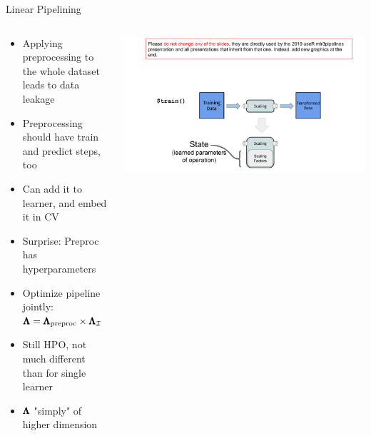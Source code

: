 \begin{frame}{Linear Pipelining}




  \begin{columns}
    \begin{column}{0.5\textwidth}
    \begin{itemize}
      \item Applying preprocessing to the whole dataset leads to data leakage
      \item Preprocessing should have train and predict steps, too
      \item Can add it to learner, and embed it in CV    
      \item Surprise: Preproc has hyperparameters 
      \item Optimize pipeline jointly: $\pmb{\Lambda} = \pmb{\Lambda}_{\text{preproc}} \times \pmb{\Lambda}_{\mathcal{I}}$ 
      \item Still HPO, not much different than for single learner
      \item $\pmb{\Lambda}$ "simply" of higher dimension
    \end{itemize}
    \end{column}%
    \begin{column}{0.5\textwidth}
      \begin{center}
        \includegraphics[page=19, width=\textwidth, trim=20 60 30 35, clip]{images/mlr3Pipelines_graphics}
      \end{center}
    \end{column}
  \end{columns}

\end{frame}

